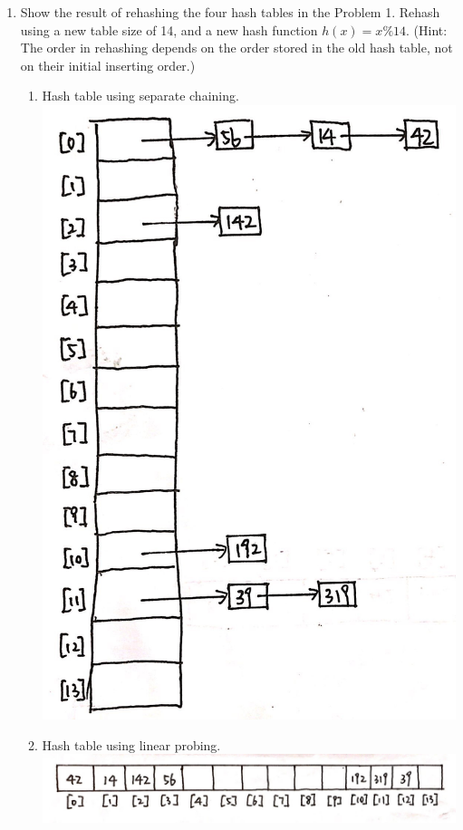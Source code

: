 \documentclass[12pt,a4paper]{article}
\theoremstyle{definition}
\begin{document}
\begin{enumerate}
\begin{enumerate}
	
	\end{enumerate}
\item	 Show the result of rehashing the four hash tables in the Problem 1. Rehash
using a new table size of 14, and a new hash function $h(x) = x\%14$. {\color{blue}(Hint: The order
in rehashing depends on the order stored in the old hash table, not on their initial
inserting order.)}
	\begin{enumerate}
	\item Hash table using separate chaining.\\
	\includegraphics[scale=0.1]{f5.jpg}
	\item Hash table using linear probing.\\
	\includegraphics[scale=0.11]{f6.jpg}

\end{enumerate}
\end{enumerate}
\end{document}
